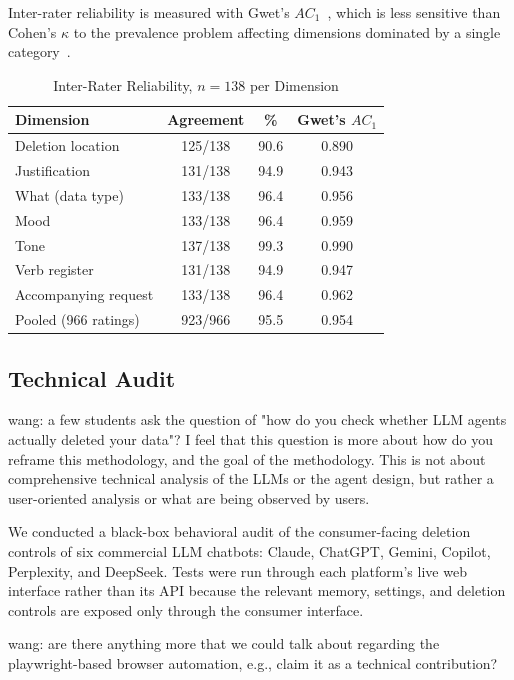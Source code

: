 \documentclass[conference,compsoc]{IEEEtran}
\newcommand{\xw}[1] {{\color{red}wang: #1}}
\begin{document}
Inter-rater reliability is measured with Gwet's $AC_1$~\cite{gwet2008ac1}, which is less sensitive than Cohen's $\kappa$ to the prevalence problem affecting dimensions dominated by a single category~\cite{gwet2008ac1,wongpakaran2013comparison}.

\begin{table}[t]
\centering
\caption{Inter-Rater Reliability, $n=138$ per Dimension}
\label{tab:ac1}
\small
\begin{tabular}{lccc}
\toprule
Dimension & Agreement & \% & Gwet's $AC_1$ \\
\midrule
Deletion location        & 125/138 & 90.6 & 0.890 \\
Justification            & 131/138 & 94.9 & 0.943 \\
What (data type)         & 133/138 & 96.4 & 0.956 \\
Mood                     & 133/138 & 96.4 & 0.959 \\
Tone                     & 137/138 & 99.3 & 0.990 \\
Verb register            & 131/138 & 94.9 & 0.947 \\
Accompanying request     & 133/138 & 96.4 & 0.962 \\
\midrule
Pooled (966 ratings) & 923/966 & 95.5 & 0.954 \\
\bottomrule
\end{tabular}
\end{table}

\subsection{Technical Audit}
\label{sec:audit-methodology}

\xw{a few students ask the question of "how do you check whether LLM agents actually deleted your data"? I feel that this question is more about how do you reframe this methodology, and the goal of the methodology. This is not about comprehensive technical analysis of the LLMs or the agent design, but rather a user-oriented analysis or what are being observed by users.}

We conducted a black-box behavioral audit of the consumer-facing deletion controls of six commercial LLM chatbots: Claude, ChatGPT, Gemini, Copilot, Perplexity, and DeepSeek. Tests were run through each platform's live web interface rather than its API because the relevant memory, settings, and deletion controls are exposed only through the consumer interface.

\xw{are there anything more that we could talk about regarding the playwright-based browser automation, e.g., claim it as a technical contribution?}
\end{document}
